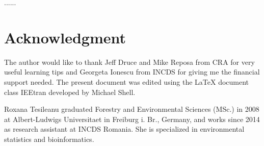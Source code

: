 \documentclass[journal]{IEEEtran}
\begin{document}
......

 

\section*{Acknowledgment}
The author would like to thank Jeff Druce and Mike Reposa from CRA for very useful learning tips and Georgeta Ionescu from INCDS for giving me the financial support needed. The present document was edited using the LaTeX document class IEEtran developed by Michael Shell.  


\begin {IEEEbiographynophoto}{Roxana Tesileanu}
graduated Forestry and Environmental Sciences (MSc.) in 2008 at Albert-Ludwigs Universitaet in Freiburg i. Br., Germany, and works since 2014 as research assistant at INCDS Romania. She is specialized in environmental statistics and bioinformatics. 
\end{IEEEbiographynophoto}
\end{document}
